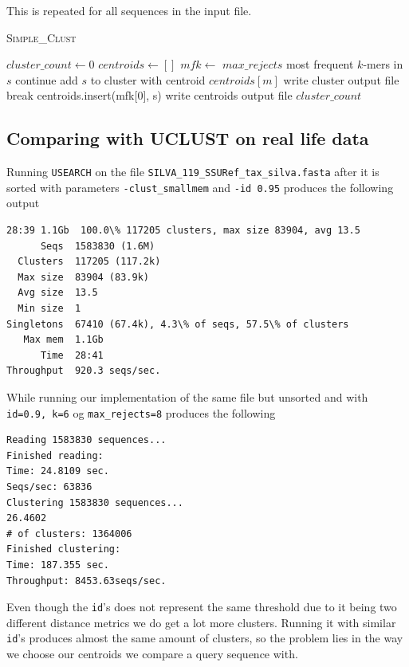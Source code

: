 This is repeated for all sequences in the input file.

\begin{algorithm}
  \caption{\textsc{Simple\_Clust}}
  \label{alg:d2_naive}
  \begin{algorithmic}[1]
    \Statex
      \State $cluster\_count \gets 0$
      \State $centroids \gets []$ 
        \State $mfk \gets$ $max\_rejects$ most frequent $k$-mers in $s$
            \State continue
            \State add $s$ to cluster with centroid $centroids[m]$
            \State write cluster output file
            \State break
          \EndIf
        \EndFor
          \State centroids.insert(mfk[0], s)
          \State write centroids output file
        \EndIf
      \EndFor
      \State \Return $cluster\_count$
    \EndFunction
  \end{algorithmic}
  \label{alg:simple_clust}
\end{algorithm}


\subsection{Comparing with UCLUST on real life data}
Running \texttt{USEARCH} on the file \texttt{SILVA\_119\_SSURef\_tax\_silva.fasta} after it is sorted with parameters \texttt{-clust\_smallmem} and \texttt{-id 0.95} produces the following output

\begin{lstlisting}
28:39 1.1Gb  100.0\% 117205 clusters, max size 83904, avg 13.5                                                        
      Seqs  1583830 (1.6M)
  Clusters  117205 (117.2k)
  Max size  83904 (83.9k)
  Avg size  13.5
  Min size  1
Singletons  67410 (67.4k), 4.3\% of seqs, 57.5\% of clusters
   Max mem  1.1Gb
      Time  28:41
Throughput  920.3 seqs/sec.
\end{lstlisting}
While running our implementation of the same file but unsorted and with \texttt{id=0.9, k=6} og \texttt{max\_rejects=8} produces the following
\begin{lstlisting}
Reading 1583830 sequences...
Finished reading:
Time: 24.8109 sec.
Seqs/sec: 63836
Clustering 1583830 sequences...
26.4602
# of clusters: 1364006
Finished clustering:
Time: 187.355 sec.
Throughput: 8453.63seqs/sec.
\end{lstlisting}
Even though the \texttt{id}'s does not represent the same threshold due to it 
being two different distance metrics we do get a lot more clusters. Running 
it with similar \texttt{id}'s produces almost the same amount of clusters, so 
the problem lies in the way we choose our centroids we compare a query 
sequence with.

